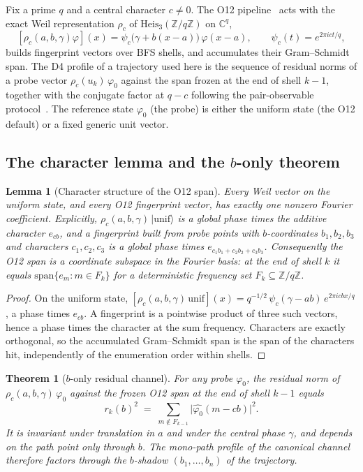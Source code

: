 \documentclass[11pt]{article}
\newtheorem{theorem}{Theorem}
\newtheorem{lemma}{Lemma}
\newcommand{\Heis}{\mathrm{Heis}_3}
\newcommand{\Zq}{\mathbb{Z}/q\mathbb{Z}}
\begin{document}
Fix a prime $q$ and a central character $c\neq 0$.
The O12 pipeline~\cite{Beau2026a16} acts with the exact Weil representation $\rho_c$ of $\Heis(\Zq)$ on
$\mathbb{C}^q$,
\[
[\rho_c(a,b,\gamma)\varphi](x) = \psi_c\!\bigl(\gamma+b(x-a)\bigr)\,\varphi(x-a),
\qquad
\psi_c(t)=e^{2\pi i c t/q},
\]
builds fingerprint vectors over BFS shells, and accumulates their Gram--Schmidt span.
The D4 profile of a trajectory used here is the sequence of residual norms of a probe vector
$\rho_c(u_k)\,\varphi_0$ against the span frozen at the end of shell $k-1$, together with the conjugate
factor at $q-c$ following the pair-observable protocol~\cite{Beau2026a20,Beau2026a29}.
The reference state $\varphi_0$ (the probe) is either the uniform state (the O12 default) or a fixed generic
unit vector.

\subsection{The character lemma and the $b$-only theorem}
\label{sec:b-only}

\begin{lemma}[Character structure of the O12 span]
\label{lem:character}
Every Weil vector on the uniform state, and every O12 fingerprint vector, has exactly one nonzero Fourier
coefficient.
Explicitly, $\rho_c(a,b,\gamma)\,|\mathrm{unif}\rangle$ is a global phase times the additive character
$e_{cb}$, and a fingerprint built from probe points with $b$-coordinates $b_1,b_2,b_3$ and characters
$c_1,c_2,c_3$ is a global phase times $e_{c_1b_1+c_2b_2+c_3b_3}$.
Consequently the O12 span is a coordinate subspace in the Fourier basis: at the end of shell $k$ it equals
$\mathrm{span}\{e_m : m\in F_k\}$ for a deterministic frequency set $F_k\subseteq\Zq$.
\end{lemma}

\begin{proof}
On the uniform state, $[\rho_c(a,b,\gamma)\,\mathrm{unif}](x) = q^{-1/2}\,\psi_c(\gamma-ab)\,e^{2\pi i cbx/q}$,
a phase times $e_{cb}$.
A fingerprint is a pointwise product of three such vectors, hence a phase times the character at the sum
frequency.
Characters are exactly orthogonal, so the accumulated Gram--Schmidt span is the span of the characters hit,
independently of the enumeration order within shells.
\end{proof}

\begin{theorem}[$b$-only residual channel]
\label{thm:b-only}
For any probe $\varphi_0$, the residual norm of $\rho_c(a,b,\gamma)\,\varphi_0$ against the frozen O12 span
at the end of shell $k-1$ equals
\[
r_k(b)^2 \;=\; \sum_{m\notin F_{k-1}} \bigl|\widehat{\varphi_0}(m-cb)\bigr|^2 .
\]
It is invariant under translation in $a$ and under the central phase $\gamma$, and depends on the path point
only through $b$.
The mono-path profile of the canonical channel therefore factors through the $b$-shadow
$(b_1,\dots,b_n)$ of the trajectory.
\end{theorem}
\end{document}
